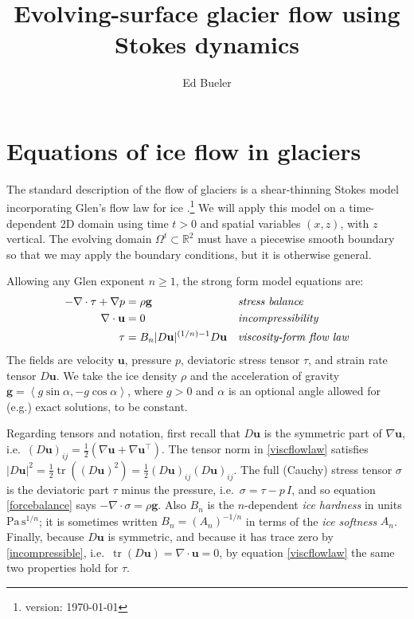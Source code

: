 \documentclass[letterpaper,final,12pt,reqno]{amsart}
\newcommand{\RR}{\mathbb{R}}
\newcommand{\grad}{\nabla}
\newcommand{\Div}{\nabla\cdot}
\newcommand{\trace}{\operatorname{tr}}
\newcommand{\bg}{\mathbf{g}}
\newcommand{\bu}{\mathbf{u}}
\begin{document}
\title{Evolving-surface glacier flow using Stokes dynamics}

\author{Ed Bueler}

\maketitle

\thispagestyle{empty}
\bigskip

\section{Equations of ice flow in glaciers} \label{sec:strongform}

The standard description of the flow of glaciers is a shear-thinning Stokes model  incorporating Glen's flow law for ice \cite{GreveBlatter2009,JouvetRappaz2011}.\footnote{version: \today}  We will apply this model on a time-dependent 2D domain using time $t>0$ and spatial variables $(x,z)$, with $z$ vertical.  The evolving domain $\Omega^t \subset \RR^2$ must have a piecewise smooth boundary so that we may apply the boundary conditions, but it is otherwise general.

Allowing any Glen exponent $n\ge 1$, the strong form model equations are:
\begin{align}
- \nabla \cdot \tau + \nabla p &= \rho \bg &&\text{\emph{stress balance}} \label{forcebalance} \\
\nabla \cdot \bu &= 0 &&\text{\emph{incompressibility}} \label{incompressible} \\
\tau &= B_n |D\bu|^{(1/n) - 1} D\bu  &&\text{\emph{viscosity-form flow law}} \label{viscflowlaw}
\end{align}
The fields are velocity $\bu$, pressure $p$, deviatoric stress tensor $\tau$, and strain rate tensor $D\bu$.  We take the ice density $\rho$ and the acceleration of gravity $\bg = \left<g\sin\alpha,-g\cos\alpha\right>$, where $g>0$ and $\alpha$ is an optional angle allowed for (e.g.) exact solutions, to be constant.

Regarding tensors and notation, first recall that $D\bu$ is the symmetric part of $\grad \bu$, i.e.~$(D\bu)_{ij} = \frac{1}{2} \left(\grad\bu + \grad\bu^\top\right)$.  The tensor norm in \eqref{viscflowlaw} satisfies $|D\bu|^2 = \frac{1}{2} \trace\left((D\bu)^2\right) = \frac{1}{2} (D\bu)_{ij} (D\bu)_{ij}$.  The full (Cauchy) stress tensor $\sigma$ is the deviatoric part $\tau$ minus the pressure, i.e.~$\sigma = \tau - p\,I$, and so equation \eqref{forcebalance} says $-\Div \sigma = \rho \bg$.  Also $B_n$ is the $n$-dependent \emph{ice hardness} in units $\text{Pa}\,\text{s}^{1/n}$; it is sometimes written $B_n = (A_n)^{-1/n}$ in terms of the \emph{ice softness} $A_n$.  Finally, because $D\bu$ is symmetric, and because it has trace zero by \eqref{incompressible}, i.e.~$\trace(D\bu)=\nabla \cdot \bu = 0$, by equation \eqref{viscflowlaw} the same two properties hold for $\tau$.
\end{document}
